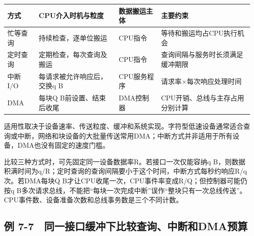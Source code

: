 \begin{wideblock}

\par\medskip\noindent\begin{minipage}{\linewidth}\fontsize{9.3}{12}\selectfont\begin{tabularx}{\linewidth}{@{}YYYY@{}}
\toprule\noalign{}
\begin{minipage}[b]{\linewidth}\raggedright
方式
\end{minipage} & \begin{minipage}[b]{\linewidth}\raggedright
CPU介入时机与粒度
\end{minipage} & \begin{minipage}[b]{\linewidth}\raggedright
数据搬运主体
\end{minipage} & \begin{minipage}[b]{\linewidth}\raggedright
主要约束
\end{minipage} \\
\midrule\noalign{}


忙等查询 & 持续检查，逐单位搬运 & CPU指令 & 等待和搬运均占CPU执行机会 \\
定时查询 & 定期检查，每次查询及搬运 & CPU指令 & 查询间隔与服务时长须满足缓冲期限 \\
中断I/O & 每请求被允许响应后，交换q B & CPU服务程序 & 请求率\ensuremath{\times}每次响应处理时间 \\
DMA & 每块Q B前设置、结束后收尾 & DMA控制器 & CPU开销、总线与主存占用分别计算 \\
\bottomrule\end{tabularx}
\end{minipage}\par\medskip

\end{wideblock}

适用性取决于设备速率、传送粒度、缓冲和系统实现。字符型低速设备通常适合查询或中断，网络和块设备的大批量传送常用DMA；中断方式并非适用于所有设备，DMA也没有固定的速度门槛。

比较三种方式时，可先固定同一设备数据率R。若接口一次仅能容纳q B，则数据积满时间为q/R；定时查询的查询间隔要小于这个时间，中断方式每秒约响应R/q次。若DMA每块Q B才让CPU收尾一次，CPU事件率变成R/Q；但控制器可能仍按q B多次请求总线，不能把``每块一次完成中断''误作``整块只有一次总线传送''。CPU事件数、设备准备次数和总线事务数是三个不同计数。

\subsection{例 7-7　同一接口缓冲下比较查询、中断和DMA预算}\label{CO07-example-7}

